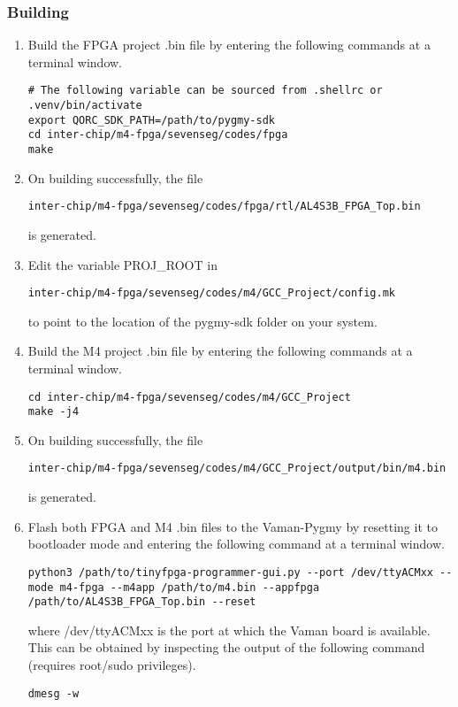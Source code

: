 \subsubsection{Building}
\begin{enumerate}
    \item Build the FPGA project .bin file by entering the following commands at
    a terminal window.
    \begin{lstlisting}
# The following variable can be sourced from .shellrc or .venv/bin/activate
export QORC_SDK_PATH=/path/to/pygmy-sdk
cd inter-chip/m4-fpga/sevenseg/codes/fpga
make
    \end{lstlisting}
    \item On building successfully, the file
    \begin{lstlisting}
inter-chip/m4-fpga/sevenseg/codes/fpga/rtl/AL4S3B_FPGA_Top.bin
    \end{lstlisting}
    is generated.
    \item Edit the variable PROJ\_ROOT in
    \begin{lstlisting}
inter-chip/m4-fpga/sevenseg/codes/m4/GCC_Project/config.mk
    \end{lstlisting}
    to point to the location of the pygmy-sdk folder on your system.
    \item Build the M4 project .bin file by entering the following commands at a
    terminal window.
    \begin{lstlisting}
cd inter-chip/m4-fpga/sevenseg/codes/m4/GCC_Project
make -j4
    \end{lstlisting}
    \item On building successfully, the file
    \begin{lstlisting}
inter-chip/m4-fpga/sevenseg/codes/m4/GCC_Project/output/bin/m4.bin
    \end{lstlisting}
    is generated.
    \item Flash both FPGA and M4 .bin files to the Vaman-Pygmy by resetting it
    to bootloader mode and entering the following command at a terminal window.
    \begin{lstlisting}
python3 /path/to/tinyfpga-programmer-gui.py --port /dev/ttyACMxx --mode m4-fpga --m4app /path/to/m4.bin --appfpga /path/to/AL4S3B_FPGA_Top.bin --reset
    \end{lstlisting}
    where /dev/ttyACMxx is the port at which the Vaman board is available. This
    can be obtained by inspecting the output of the following command (requires
    root/sudo privileges).
    \begin{lstlisting}
dmesg -w
    \end{lstlisting}
\end{enumerate}

